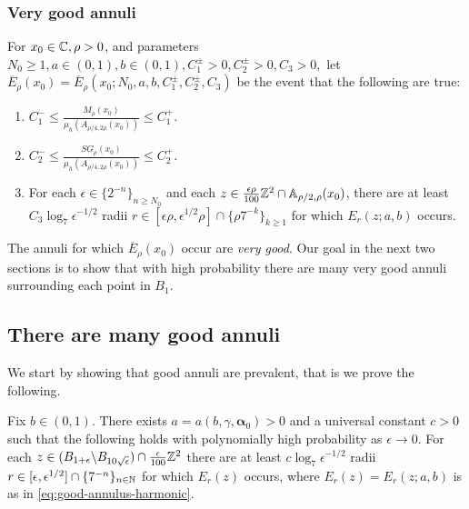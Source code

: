 \documentclass[12pt]{amsart}
\numberwithin{equation}{section}
\newcommand{\Mrho}[2]{\hyperref[eq:alternate-size]{M_{#1}(#2)}}
\newcommand{\SGrho}[2]{\hyperref[eq:alternate-size-2]{SG_{#1}(#2)}}
\begin{document}
	\subsubsection{Very good annuli}
	For $x_0 \in \mathbb{C}, \rho > 0$, and parameters $N_0 \geq 1,  a \in (0,1),b \in(0,1), C^{\pm}_1 > 0, C^{\pm}_2 > 0, C_3 > 0, $ let $\overline E_\rho(x_0) = \overline E_\rho(x_0; N_0, a, b,C^{\pm}_1, C^{\pm}_2, C_3)$ be the event that the following are true:
	\begin{enumerate}[label=(VG-\roman*)]
		\item $C^-_1  \leq \frac{\Mrho{\rho}{x_0}}{\mu_h(A_{\rho/4, 2 \rho}(x_0))} \leq C^+_1$.  \label{enum:very-good-criteria-1}
		\item $C^-_2  \leq \frac{\SGrho{\rho}{x_0}}{\mu_h(A_{\rho/4, 2 \rho}(x_0))} \leq C^+_2$.   \label{enum:very-good-criteria-2}
		\item For each $\epsilon \in \{2^{-n}\}_{n \geq N_0}$
		and each $z \in \frac{\epsilon \rho}{100} \mathbb{Z}^2 \cap \mathbb{A}_{\rho/2, \rho}(x_0)$,
		there are at least $C_3 \log_7 \epsilon^{-1/2}$ radii $r \in [\epsilon \rho, \epsilon^{1/2} \rho] \cap \{\rho 7^{-k}\}_{k \geq 1}$
		for which $E_r(z; a, b)$ occurs.   \label{enum:very-good-criteria-3}
	\end{enumerate}
	The annuli for which $\overline E_{\rho}(x_0)$ occur are {\it very good}. 
	Our goal in the next two sections is to show that with high probability there are many very good annuli surrounding each point in $B_1$.
	
	
	
	
	
	
	\subsection{There are many good annuli} \label{subsec:good-annuli-are-prevalent}
	
	
	We start by showing that good annuli are prevalent, that is we prove the following. 
	
	
	
	\begin{lemma} \label{lemma:good-annuli}
		Fix $b \in (0,1)$. There exists $a = a(b,\gamma,\boldsymbol{\alpha}_0) > 0$ and a universal constant $c > 0$ such that the following holds %
		with polynomially high probability as $\epsilon \to 0$. 
		For each $z \in (B_{1 + \epsilon} \backslash B_{10 \sqrt{\epsilon}}) \cap \frac{\epsilon}{100} \mathbb{Z}^2$ there are at least $c \log_7 \epsilon^{-1/2}$ radii $r \in [\epsilon, \epsilon^{1/2}] \cap
		\{7^{-n}\}_{n \in \mathbb{N}}$ for which $E_r(z)$ occurs, where $E_r(z) = E_r(z; a, b)$ is as in \eqref{eq:good-annulus-harmonic}. 
	\end{lemma}
	
\end{document}
